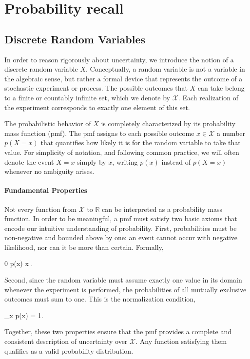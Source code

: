 \chapter{Probability recall}

\section*{Discrete Random Variables}

In order to reason rigorously about uncertainty, we introduce the notion of a discrete \alert{random variable} $X$. Conceptually, a random variable is not a variable in the algebraic sense, but rather a formal device that represents the outcome of a stochastic experiment or process. The possible outcomes that $X$ can take belong to a finite or countably infinite set, which we denote by $\mathcal{X}$. Each realization of the experiment corresponds to exactly one element of this set.

The probabilistic behavior of $X$ is completely characterized by its \alert{probability mass function} (pmf). The pmf assigns to each possible outcome $x\in\mathcal{X}$ a number $p(X=x)$ that quantifies how likely it is for the random variable to take that value. For simplicity of notation, and following common practice, we will often denote the event $X=x$ simply by $x$, writing $p(x)$ instead of $p(X=x)$ whenever no ambiguity arises.

\subsubsection*{Fundamental Properties}

Not every function from $\mathcal{X}$ to $\mathbb{R}$ can be interpreted as a probability mass function. In order to be meaningful, a pmf must satisfy two basic axioms that encode our intuitive understanding of probability. First, probabilities must be non-negative and bounded above by one: an event cannot occur with negative likelihood, nor can it be more than certain. Formally,
\begin{myequation}
0 \leq p(x)  \quad {} x \in {}.
\end{myequation}
Second, since the random variable must assume exactly one value in its domain whenever the experiment is performed, the probabilities of all mutually exclusive outcomes must sum to one. This is the normalization condition,
\begin{myequation}
\sum_{x \in {}} p(x) = 1.
\end{myequation}
Together, these two properties ensure that the pmf provides a complete and consistent description of uncertainty over $\mathcal{X}$. Any function satisfying them qualifies as a valid probability distribution.

